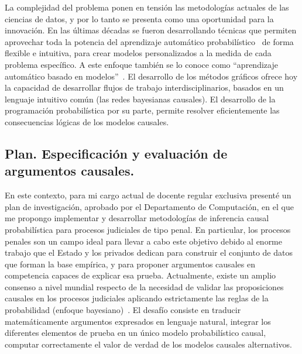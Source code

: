 \documentclass[a4paper,11pt]{book}
\theoremstyle{definition}
\begin{document}
La complejidad del problema ponen en tensi\'on las metodolog\'ias actuales de las ciencias de datos, y por lo tanto se presenta como una oportunidad para la innovaci\'on.
%
En las \'ultimas d\'ecadas se fueron desarrollando t\'ecnicas que permiten aprovechar toda la potencia del aprendizaje autom\'atico probabil\'istico~\cite{murphy-pmlBook1,murphy-pmlBook2} de forma flexible e intuitiva, para crear modelos personalizados a la medida de cada problema espec\'ifico.
%
A este enfoque tambi\'en se lo conoce como ``aprendizaje autom\'atico basado en modelos''~\cite{Bishop2013, Bishop2006}.
%
El desarrollo de los m\'etodos gr\'aficos ofrece hoy la capacidad de desarrollar flujos de trabajo interdisciplinarios, basados en un lenguaje intuitivo com\'un (las redes bayesianas causales).
%
El desarrollo de la programaci\'on probabil\'istica por su parte, permite resolver eficientemente las consecuencias l\'ogicas de los modelos causales.

\subsection{Plan. Especificaci\'on y evaluaci\'on de argumentos causales.}

En este contexto, para mi cargo actual de docente regular exclusiva present\'e un plan de investigaci\'on, aprobado por el Departamento de Computaci\'on, en el que me propongo implementar y desarrollar metodolog\'ias de inferencia causal probabil\'istica para procesos judiciales de tipo penal.
%
En particular, los procesos penales son un campo ideal para llevar a cabo este objetivo debido al enorme trabajo que el Estado y los privados dedican para construir el conjunto de datos que forman la base emp\'irica, y para proponer argumentos causales en competencia capaces de explicar esa prueba.
%
Actualmente, existe un amplio consenso a nivel mundial respecto de la necesidad de validar las proposiciones causales en los procesos judiciales aplicando estrictamente las reglas de la probabilidad (enfoque bayesiano)~\cite{taroni2014-bayesian, banks2020-handbook, morrison2022-forensicDataScience}.
%
El desaf\'io consiste en traducir matem\'aticamente argumentos expresados en lenguaje natural, integrar los diferentes elementos de prueba en un \'unico modelo probabil\'istico causal, computar correctamente el valor de verdad de los modelos causales alternativos.
\end{document}
